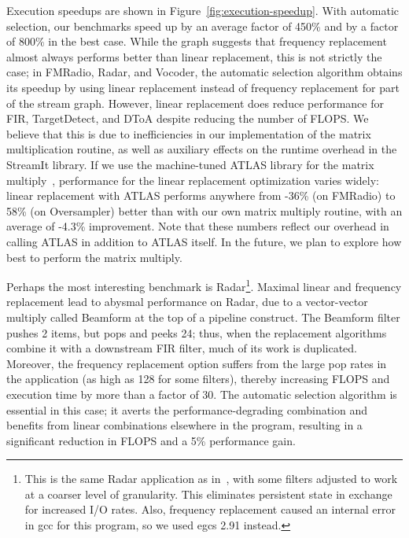 Execution speedups are shown in Figure~\ref{fig:execution-speedup}.
With automatic selection, our benchmarks speed up by an average factor
of 450\% and by a factor of 800\% in the best case.  While the graph
suggests that frequency replacement almost always performs better than
linear replacement, this is not strictly the case; in FMRadio, Radar,
and Vocoder, the automatic selection algorithm obtains its speedup by
using linear replacement instead of frequency replacement for part of
the stream graph.  However, linear replacement does reduce performance
for FIR, TargetDetect, and DToA despite reducing the number of FLOPS.
We believe that this is due to inefficiencies in our implementation of
the matrix multiplication routine, as well as auxiliary effects on the
runtime overhead in the StreamIt library.  If we use the machine-tuned
ATLAS library for the matrix multiply~\cite{whaley01automated},
performance for the linear replacement optimization varies widely:
linear replacement with ATLAS performs anywhere from -36\% (on
FMRadio) to 58\% (on Oversampler) better than with our own matrix
multiply routine, with an average of -4.3\% improvement.  Note that
these numbers reflect our overhead in calling ATLAS in addition to
ATLAS itself.  In the future, we plan to explore how best to perform
the matrix multiply.

Perhaps the most interesting benchmark is Radar\footnote{\small This
is the same Radar application as in~\cite{streamit-asplos}, with some
filters adjusted to work at a coarser level of granularity.  This
eliminates persistent state in exchange for increased I/O rates.
Also, frequency replacement caused an internal error in gcc for this
program, so we used egcs 2.91 instead.}.  Maximal linear and frequency
replacement lead to abysmal performance on Radar, due to a
vector-vector multiply called Beamform at the top of a pipeline
construct.  The Beamform filter pushes 2 items, but pops and peeks 24;
thus, when the replacement algorithms combine it with a downstream FIR
filter, much of its work is duplicated.  Moreover, the frequency
replacement option suffers from the large pop rates in the application
(as high as 128 for some filters), thereby increasing FLOPS and
execution time by more than a factor of 30.  The automatic selection
algorithm is essential in this case; it averts the
performance-degrading combination and benefits from linear
combinations elsewhere in the program, resulting in a significant
reduction in FLOPS and a 5\% performance gain.

